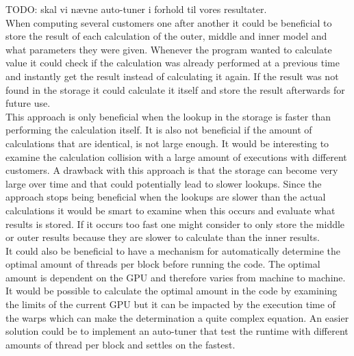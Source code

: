 

TODO: skal vi nævne auto-tuner i forhold til vores resultater. \\


When computing several customers one after another it could be beneficial to store the result of each calculation of the outer, middle and inner model and what parameters they were given. Whenever the program wanted to calculate value it could check if the calculation was already performed at a previous time and instantly get the result instead of calculating it again. If the result was not found in the storage it could calculate it itself and store the result afterwards for future use. \\ 

This approach is only beneficial when the lookup in the storage is faster than performing the calculation itself. It is also not beneficial if the amount of calculations that are identical, is not large enough. It would be interesting to examine the calculation collision with a large amount of executions with different customers. A drawback with this approach is that the storage can become very large over time and that could potentially lead to slower lookups. Since the approach stops being beneficial when the lookups are slower than the actual calculations it would be smart to examine when this occurs and evaluate what results is stored. If it occurs too fast one might consider to only store the middle or outer results because they are slower to calculate than the inner results. \\

It could also be beneficial to have a mechanism for automatically determine the optimal amount of threads per block before running the code. The optimal amount is dependent on the GPU and therefore varies from machine to machine. It would be possible to calculate the optimal amount in the code by examining the limits of the current GPU but it can be impacted by the execution time of the warps which can make the determination a quite complex equation. An easier solution could be to implement an auto-tuner that test the runtime with different amounts of thread per block and settles on the fastest. \\

